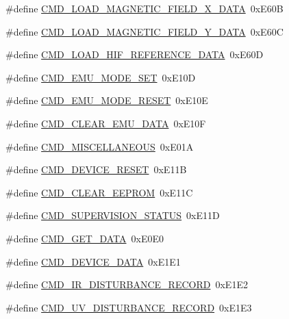 \begin{DoxyCompactItemize}
\#define \hyperlink{a00031_a9e5d9d302e44daccbe233d321696b12c}{C\+M\+D\+\_\+\+L\+O\+A\+D\+\_\+\+M\+A\+G\+N\+E\+T\+I\+C\+\_\+\+F\+I\+E\+L\+D\+\_\+\+X\+\_\+\+D\+A\+T\+A}~0x\+E60\+B
\item 
\#define \hyperlink{a00031_ace011e2ba41b184650e8bd0ddbfa00d2}{C\+M\+D\+\_\+\+L\+O\+A\+D\+\_\+\+M\+A\+G\+N\+E\+T\+I\+C\+\_\+\+F\+I\+E\+L\+D\+\_\+\+Y\+\_\+\+D\+A\+T\+A}~0x\+E60\+C
\item 
\#define \hyperlink{a00031_afc4f83cb04e57ee185a039b10e19e297}{C\+M\+D\+\_\+\+L\+O\+A\+D\+\_\+\+H\+I\+F\+\_\+\+R\+E\+F\+E\+R\+E\+N\+C\+E\+\_\+\+D\+A\+T\+A}~0x\+E60\+D
\item 
\#define \hyperlink{a00031_ac80fdfdbada05f61256bef39c2064330}{C\+M\+D\+\_\+\+E\+M\+U\+\_\+\+M\+O\+D\+E\+\_\+\+S\+E\+T}~0x\+E10\+D
\item 
\#define \hyperlink{a00031_a48532ee6ce8c4c41bc6a972f66998ca6}{C\+M\+D\+\_\+\+E\+M\+U\+\_\+\+M\+O\+D\+E\+\_\+\+R\+E\+S\+E\+T}~0x\+E10\+E
\item 
\#define \hyperlink{a00031_aa5f71f685588bc4e978cd6d595a5ea81}{C\+M\+D\+\_\+\+C\+L\+E\+A\+R\+\_\+\+E\+M\+U\+\_\+\+D\+A\+T\+A}~0x\+E10\+F
\item 
\#define \hyperlink{a00031_a1c028104d44ece3aca38373da0345c04}{C\+M\+D\+\_\+\+M\+I\+S\+C\+E\+L\+L\+A\+N\+E\+O\+U\+S}~0x\+E01\+A
\item 
\#define \hyperlink{a00031_ac4c8a78ea50054745a0ac0792baa7657}{C\+M\+D\+\_\+\+D\+E\+V\+I\+C\+E\+\_\+\+R\+E\+S\+E\+T}~0x\+E11\+B
\item 
\#define \hyperlink{a00031_a9084e0a84e73318b6fad9841fb4d4f98}{C\+M\+D\+\_\+\+C\+L\+E\+A\+R\+\_\+\+E\+E\+P\+R\+O\+M}~0x\+E11\+C
\item 
\#define \hyperlink{a00031_ad6af9210ac0903986f3ac3e55c6816a3}{C\+M\+D\+\_\+\+S\+U\+P\+E\+R\+V\+I\+S\+I\+O\+N\+\_\+\+S\+T\+A\+T\+U\+S}~0x\+E11\+D
\item 
\#define \hyperlink{a00031_af89ae6f2252e558fc6e54ea9b452bf0e}{C\+M\+D\+\_\+\+G\+E\+T\+\_\+\+D\+A\+T\+A}~0x\+E0\+E0
\item 
\#define \hyperlink{a00031_a4412fcb90fb9171d432a624428881e70}{C\+M\+D\+\_\+\+D\+E\+V\+I\+C\+E\+\_\+\+D\+A\+T\+A}~0x\+E1\+E1
\item 
\#define \hyperlink{a00031_ad37cd290161f0a245d189c3f4e014d4e}{C\+M\+D\+\_\+\+I\+R\+\_\+\+D\+I\+S\+T\+U\+R\+B\+A\+N\+C\+E\+\_\+\+R\+E\+C\+O\+R\+D}~0x\+E1\+E2
\item 
\#define \hyperlink{a00031_ae45bb46748497c6a117beb1e93072d83}{C\+M\+D\+\_\+\+U\+V\+\_\+\+D\+I\+S\+T\+U\+R\+B\+A\+N\+C\+E\+\_\+\+R\+E\+C\+O\+R\+D}~0x\+E1\+E3

\end{DoxyCompactItemize}
